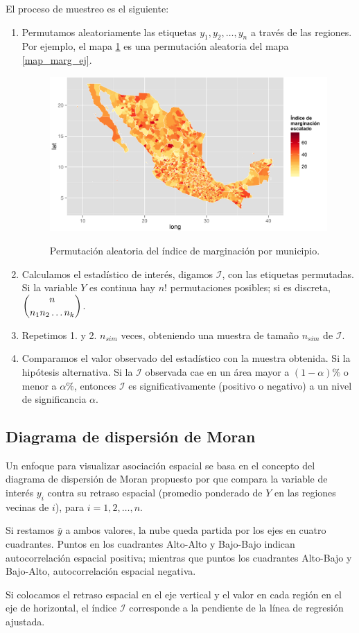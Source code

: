    El proceso de muestreo es el siguiente:
    \begin{enumerate}
    \item Permutamos aleatoriamente las etiquetas $y_1, y_2, \dots, y_n$ a través de las regiones. Por ejemplo, el mapa \ref{rmap_marg_ej} es una permutación aleatoria del mapa \ref{map_marg_ej}.
    \begin{figure}[!ht]
      \centering
      \includegraphics[width=\textwidth]{./maps/rmapmarg.png} \\
      \caption{ Permutación aleatoria del índice de marginación por municipio.}
      \label{rmap_marg_ej}  
    \end{figure}

    \item Calculamos el estadístico de interés, digamos $\mathcal{I}$, con las etiquetas permutadas. Si la variable $Y$ es continua hay $n!$ permutaciones posibles; si es discreta, $\dbinom{n}{n_1 n_2 \dots n_k}$.
    \item Repetimos 1. y 2. $n_{sim}$ veces, obteniendo una muestra de tamaño $n_{sim}$ de $\mathcal{I}$. 
    \item Comparamos el valor observado del estadístico con la muestra obtenida. Si la hipótesis alternativa. Si la $\mathcal{I}$ observada cae en un área mayor a $(1-\alpha)\%$ o menor a $\alpha\%$, entonces $\mathcal{I}$ es significativamente (positivo o negativo) a un nivel de significancia $\alpha$.
    \end{enumerate}


\subsection{Diagrama de dispersión de Moran} 
Un enfoque para visualizar asociación espacial se basa en el concepto del diagrama de dispersión de Moran propuesto por \citet{anselin93} que compara la variable de interés $y_i$  contra su retraso espacial (promedio ponderado de $Y$ en las regiones vecinas de $i$), para $i=1,2,\dots,n$. 

Si restamos $\bar{y}$ a ambos valores, la nube queda partida por los ejes en cuatro cuadrantes. Puntos en los cuadrantes Alto-Alto y Bajo-Bajo indican autocorrelación espacial positiva; mientras que puntos los cuadrantes Alto-Bajo y Bajo-Alto, autocorrelación espacial negativa.

Si colocamos el retraso espacial en el eje vertical y el valor en cada región en el eje de horizontal, el índice $\mathcal{I}$ corresponde a la pendiente de la línea de regresión ajustada.

